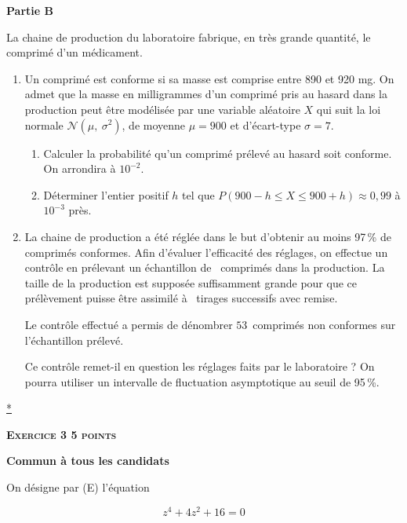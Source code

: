\documentclass[10pt]{article}
\begin{document}
\bigskip

\textbf{Partie B}

\medskip
 
La chaine de production du laboratoire fabrique, en très grande quantité, le comprimé  
d'un médicament.

\medskip

\begin{enumerate}
\item Un comprimé est conforme si sa masse est comprise entre 890 et 920 mg. On admet que la masse en milligrammes d'un comprimé pris au hasard dans la production peut être modélisée par une variable aléatoire $X$ qui suit la loi normale $\mathcal{N}\left(\mu,~\sigma^2\right)$, de moyenne $\mu = 900$ et d'écart-type $\sigma = 7$.   
	\begin{enumerate}
		\item Calculer la probabilité qu'un comprimé prélevé au hasard soit conforme. On arrondira à $10^{-2}$. 
		\item Déterminer l'entier positif $h$ tel que $P(900 - h \leqslant  X \leqslant  900 + h) \approx  0,99$ à $10^{-3}$ près. 
	\end{enumerate}
\item La chaine de production a été réglée dans le but d'obtenir au moins 97\,\% de comprimés conformes. Afin d'évaluer l'efficacité des réglages, on effectue un contrôle en prélevant un échantillon de ~comprimés dans la production. La taille de la production est supposée suffisamment grande pour que ce prélèvement puisse être assimilé à ~tirages successifs avec remise. 

Le contrôle effectué a permis de dénombrer $53$~comprimés non conformes sur l'échantillon prélevé. 

Ce contrôle remet-il en question les réglages faits par le laboratoire ? On pourra utiliser un intervalle de fluctuation asymptotique au seuil de 95\,\%. 
\end{enumerate}

\hyperlink{Index}{*}

\vspace{0,5cm}

\textbf{\textsc{Exercice 3 \hfill 5 points}}

\textbf{Commun à tous les candidats} 

\medskip 

On désigne par (E) l'équation 

\[z^4 + 4z^2 + 16 = 0\]
\end{document}

